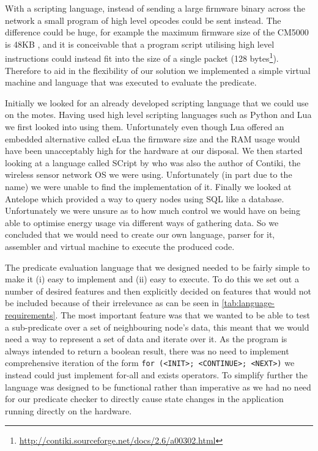 With a scripting language, instead of sending a large firmware binary across the network a small program of high level opcodes could be sent instead. The difference could be huge, for example the maximum firmware size of the CM5000 is 48KB \cite{CM5000}, and it is conceivable that a program script utilising high level instructions could instead fit into the size of a single packet (128 bytes\footnote{\url{http://contiki.sourceforge.net/docs/2.6/a00302.html}}). Therefore to aid in the flexibility of our solution we implemented a simple virtual machine and language that was executed to evaluate the predicate.


Initially we looked for an already developed scripting language that we could use on the motes. Having used high level scripting languages such as Python and Lua we first looked into using them. Unfortunately even though Lua offered an embedded alternative called eLua \cite{elua} the firmware size and the RAM usage would have been unacceptably high for the hardware at our disposal. We then started looking at a language called SCript  \cite{dunkels06lowoverhead} by  \citeauthor{dunkels06lowoverhead} who was also the author of Contiki, the wireless sensor network OS we were using. Unfortunately (in part due to the name) we were unable to find the implementation of it. Finally we looked at Antelope \cite{Tsiftes:2011:DS:2070942.2070974} which provided a way to query nodes using SQL like a database. Unfortunately we were unsure as to how much control we would have on being able to optimise energy usage via different ways of gathering data. So we concluded that we would need to create our own language, parser for it, assembler and virtual machine to execute the produced code.


The predicate evaluation language that we designed needed to be fairly simple to make it (i) easy to implement and (ii) easy to execute. To do this we set out a number of desired features and then explicitly decided on features that would not be included because of their irrelevance as can be seen in \autoref{tab:language-requirements}. The most important feature was that we wanted to be able to test a sub-predicate over a set of neighbouring node's data, this meant that we would need a way to represent a set of data and iterate over it. As the program is always intended to return a boolean result, there was no need to implement comprehensive iteration of the form \verb|for (<INIT>; <CONTINUE>; <NEXT>)| we instead could just implement for-all and exists operators. To simplify further the language was designed to be functional rather than imperative as we had no need for our predicate checker to directly cause state changes in the application running directly on the hardware.

